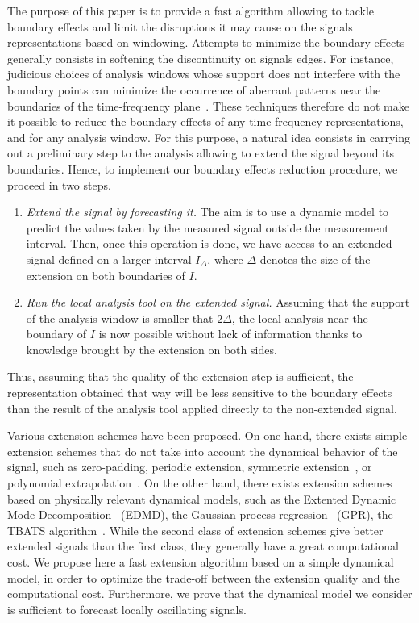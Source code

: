 \documentclass[journal]{IEEEtran}
\begin{document}
The purpose of this paper is to provide a fast algorithm allowing to tackle boundary effects and limit the disruptions it may cause on the signals representations based on windowing. Attempts to minimize the boundary effects generally consists in softening the discontinuity on signals edges. For instance, judicious choices of analysis windows whose support does not interfere with the boundary  points can minimize the occurrence of aberrant patterns near the boundaries of the time-frequency plane~\cite{Chui92wavelets,Depczynski99fast}. These techniques therefore do not make it possible to reduce the boundary effects of any time-frequency representations, and for any analysis window. For this purpose, a natural idea consists in carrying out a preliminary step to the analysis allowing to extend the signal beyond its boundaries. Hence, to implement our boundary effects reduction procedure, we proceed in two steps.
\begin{enumerate}
\item \emph{Extend the signal by forecasting it.} The aim is to use a dynamic model to predict the values taken by the measured signal outside the measurement interval. Then, once this operation is done, we have access to an extended signal defined on a larger interval $I_\Delta$, where $\Delta$ denotes the size of the extension on both boundaries of $I$.
\item \emph{Run the local analysis tool on the extended signal.} Assuming that the support of the analysis window is smaller that $2\Delta$, the local analysis near the boundary of $I$ is now possible without lack of information thanks to knowledge brought by the extension on both sides. 
\end{enumerate}
Thus, assuming that the quality of the extension step is sufficient, the representation obtained that way will be less sensitive to the boundary effects than the result of the analysis tool applied directly to the non-extended signal. 

Various extension schemes have been proposed. On one hand, there exists simple extension schemes that do not take into account the dynamical behavior of the signal, such as zero-padding, periodic extension, symmetric extension~\cite{Kharitonenko02wavelet,Chen95symmetric}, or polynomial extrapolation~\cite{Williams97discrete}. On the other hand, there exists extension schemes based on physically relevant dynamical models, such as the Extented Dynamic Mode Decomposition~\cite{Williams15data} (EDMD), the Gaussian process regression~\cite{Rasmussen06gaussian,Roberts13Gaussian} (GPR), the TBATS algorithm~\cite{DeLivera11forecasting}.  While the second class of extension schemes give better extended signals than the first class, they generally have a great computational cost. We propose here a fast extension algorithm based on a simple dynamical model, in order to optimize the trade-off between the extension quality and the computational cost. Furthermore, we prove that the dynamical model we consider is sufficient to forecast locally oscillating signals.
\end{document}
